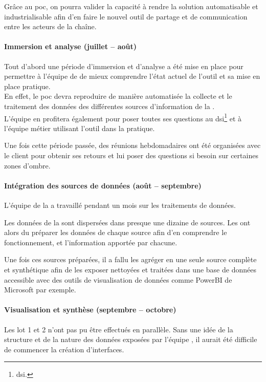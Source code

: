 Grâce au \gls{poc}, on pourra valider la capacité à rendre la solution automatisable et industrialisable afin d'en faire le nouvel outil de partage et de communication entre les acteurs de la chaîne.


\paragraph{Immersion et analyse (juillet -- août)}

Tout d'abord une période d'\og immersion et d'analyse \fg a été mise en place pour permettre à l'équipe de \tnp de mieux comprendre l'état actuel de l'outil et sa mise en place pratique.\\
En effet, le \gls{poc} devra reproduire de manière automatisée la collecte et le traitement des données des différentes sources d'information de la \sncf.\\ L'équipe en profitera également pour poser toutes ses questions au
\gls{dsi}\footnote{\glsdesc{dsi}.}
et à l'équipe métier utilisant l'outil dans la pratique.


Une fois cette période passée, des réunions hebdomadaires ont été organisées avec le client pour obtenir ses retours et lui poser des questions si besoin sur certaines zones d'ombre.

\paragraph{Intégration des sources de données (août -- septembre)}

L'équipe \ds de la \df a travaillé pendant un mois sur les traitements de données.

Les données de la \sncf sont dispersées dans presque une dizaine de sources. Les \ds ont alors du préparer les données de chaque source afin d'en comprendre le fonctionnement, et l'information apportée par chacune.

Une fois ces sources préparées, il a fallu les agréger en une seule source complète et synthétique afin de les exposer nettoyées et traitées dans une base de données accessible avec des outils de visualisation de données comme PowerBI de Microsoft par exemple.

\paragraph{Visualisation et synthèse (septembre -- octobre)}

Les lot 1 et 2 n'ont pas pu être effectués en parallèle. Sans une idée de la structure et de la nature des données exposées par l'équipe \ds, il aurait été difficile de commencer la création d'interfaces.

